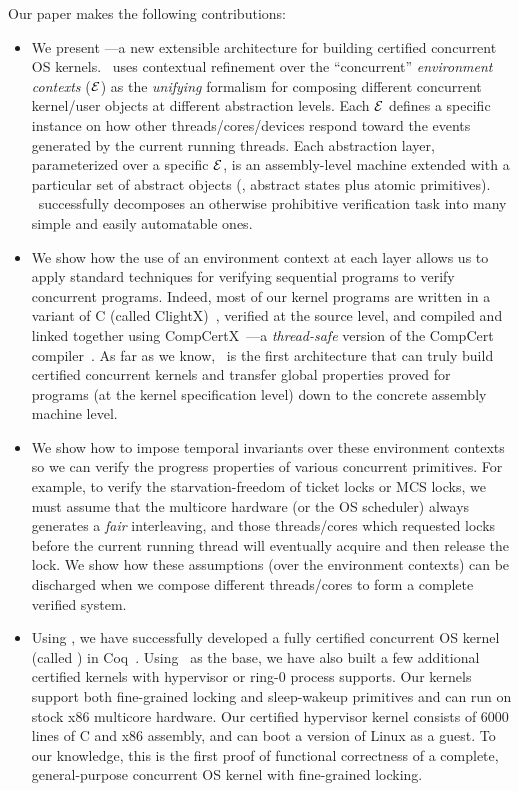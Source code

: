 {Our paper makes the following contributions:
\begin{itemize} \itemsep 0pt
\item We present {\bf{}\CTOS}---a new extensible architecture for
  building certified concurrent OS kernels.  \CTOS\ uses 
  contextual refinement over the ``concurrent'' {\em environment contexts}
  ($\mathcal{E}$) as the {\em unifying} formalism for composing 
  different concurrent kernel/user objects at different
  abstraction levels.  Each $\mathcal{E}$ defines a specific instance on how
  other threads/cores/devices respond toward the events generated by
  the current running threads.  Each abstraction layer, 
  parameterized over a specific $\mathcal{E}$, is an
  assembly-level machine extended with a particular set of
  abstract objects (\ie, abstract states plus atomic primitives).
  \CTOS\ successfully decomposes an
  otherwise prohibitive verification task into many simple and easily
  automatable ones.
\item We show how the use of an environment context at each
  layer allows us to apply standard techniques for
  verifying sequential programs to verify concurrent programs.
  Indeed, most of our kernel programs are written in a variant of C
  (called ClightX)~\cite{dscal15}, verified at the source level, and
  compiled and linked together using
  CompCertX~\cite{dscal15}---a {\em thread-safe} version of the CompCert
  compiler~\cite{compcert,leroy09}. As far as we
  know, \CTOS\ is the first architecture that can truly build
  certified concurrent kernels and transfer global properties proved
  for programs (at the kernel specification level) down to the
  concrete assembly machine level.
\item We show how to impose temporal invariants over these environment
  contexts so we can verify the progress properties of various
  concurrent primitives. For example, to verify the starvation-freedom
  of ticket locks or MCS locks, we must assume that the multicore
  hardware (or the OS scheduler) always generates a {\em fair}
  interleaving, and those threads/cores which requested locks before
  the current running thread will eventually acquire and then release
  the lock. We show how these assumptions (over the environment contexts)
  can be discharged when we compose different threads/cores to form
  a complete verified system.
\item Using \CTOS, we have successfully developed a fully certified
  concurrent OS kernel (called {\bf \mCTOS}) in Coq~\cite{coq}.  Using
  \mCTOS\ as the base, we have also built a few additional certified
  kernels with hypervisor or ring-0 process supports.  Our kernels
  support both fine-grained locking and sleep-wakeup primitives and
  can run on stock x86 multicore hardware. Our certified hypervisor
  kernel consists of 6000 lines of C and x86 assembly, and can boot a
  version of Linux as a guest.
  To our knowledge, this is the
  first proof of functional correctness of a complete, general-purpose
  concurrent OS kernel with fine-grained locking.
\end{itemize}

}
